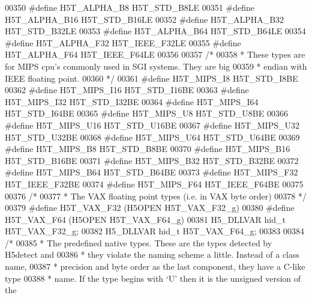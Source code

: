 \begin{DoxyCode}
00350 \textcolor{preprocessor}{#define H5T\_ALPHA\_B8        H5T\_STD\_B8LE}
00351 \textcolor{preprocessor}{#define H5T\_ALPHA\_B16       H5T\_STD\_B16LE}
00352 \textcolor{preprocessor}{#define H5T\_ALPHA\_B32       H5T\_STD\_B32LE}
00353 \textcolor{preprocessor}{#define H5T\_ALPHA\_B64       H5T\_STD\_B64LE}
00354 \textcolor{preprocessor}{#define H5T\_ALPHA\_F32       H5T\_IEEE\_F32LE}
00355 \textcolor{preprocessor}{#define H5T\_ALPHA\_F64       H5T\_IEEE\_F64LE}
00356 
00357 \textcolor{comment}{/*}
00358 \textcolor{comment}{ * These types are for MIPS cpu's commonly used in SGI systems. They are big}
00359 \textcolor{comment}{ * endian with IEEE floating point.}
00360 \textcolor{comment}{ */}
00361 \textcolor{preprocessor}{#define H5T\_MIPS\_I8     H5T\_STD\_I8BE}
00362 \textcolor{preprocessor}{#define H5T\_MIPS\_I16        H5T\_STD\_I16BE}
00363 \textcolor{preprocessor}{#define H5T\_MIPS\_I32        H5T\_STD\_I32BE}
00364 \textcolor{preprocessor}{#define H5T\_MIPS\_I64        H5T\_STD\_I64BE}
00365 \textcolor{preprocessor}{#define H5T\_MIPS\_U8     H5T\_STD\_U8BE}
00366 \textcolor{preprocessor}{#define H5T\_MIPS\_U16        H5T\_STD\_U16BE}
00367 \textcolor{preprocessor}{#define H5T\_MIPS\_U32        H5T\_STD\_U32BE}
00368 \textcolor{preprocessor}{#define H5T\_MIPS\_U64        H5T\_STD\_U64BE}
00369 \textcolor{preprocessor}{#define H5T\_MIPS\_B8     H5T\_STD\_B8BE}
00370 \textcolor{preprocessor}{#define H5T\_MIPS\_B16        H5T\_STD\_B16BE}
00371 \textcolor{preprocessor}{#define H5T\_MIPS\_B32        H5T\_STD\_B32BE}
00372 \textcolor{preprocessor}{#define H5T\_MIPS\_B64        H5T\_STD\_B64BE}
00373 \textcolor{preprocessor}{#define H5T\_MIPS\_F32        H5T\_IEEE\_F32BE}
00374 \textcolor{preprocessor}{#define H5T\_MIPS\_F64        H5T\_IEEE\_F64BE}
00375 
00376 \textcolor{comment}{/*}
00377 \textcolor{comment}{ * The VAX floating point types (i.e. in VAX byte order)}
00378 \textcolor{comment}{ */}
00379 \textcolor{preprocessor}{#define H5T\_VAX\_F32     (H5OPEN H5T\_VAX\_F32\_g)}
00380 \textcolor{preprocessor}{#define H5T\_VAX\_F64     (H5OPEN H5T\_VAX\_F64\_g)}
00381 H5\_DLLVAR hid\_t H5T\_VAX\_F32\_g;
00382 H5\_DLLVAR hid\_t H5T\_VAX\_F64\_g;
00383 
00384 \textcolor{comment}{/*}
00385 \textcolor{comment}{ * The predefined native types. These are the types detected by H5detect and}
00386 \textcolor{comment}{ * they violate the naming scheme a little.  Instead of a class name,}
00387 \textcolor{comment}{ * precision and byte order as the last component, they have a C-like type}
00388 \textcolor{comment}{ * name.  If the type begins with `U' then it is the unsigned version of the}

\end{DoxyCode}
